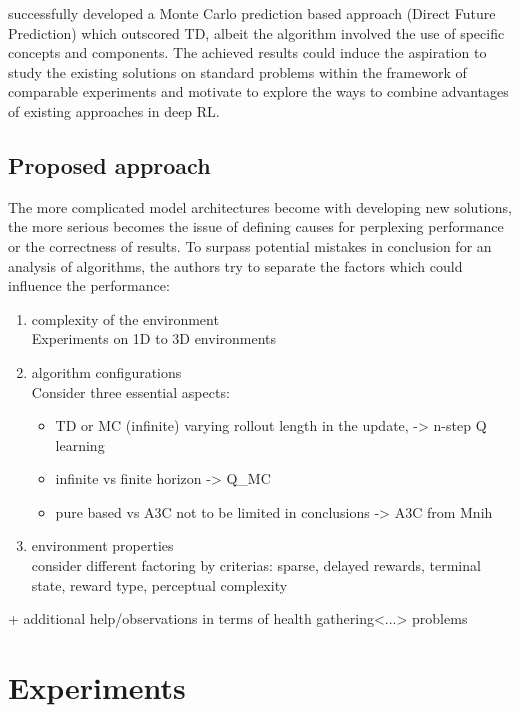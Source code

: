 \documentclass{article}
\begin{document}
\citet{DBLP:journals/corr/DosovitskiyK16} successfully developed a Monte Carlo
prediction based approach (Direct Future Prediction) which outscored TD,
albeit the algorithm involved the use of specific concepts and
components. The achieved results
could induce the aspiration to study the existing solutions on standard
problems within the framework of comparable experiments and motivate
to explore the ways to combine advantages of existing approaches in deep RL.

\subsection{Proposed approach}
\color{red}
The more complicated model architectures become with developing
new solutions, the more serious becomes the issue of defining causes
for perplexing performance
or the correctness of results.
To surpass potential mistakes in conclusion for an analysis of algorithms,
the authors try to separate the factors which could influence
the performance:
\begin{enumerate}
\item complexity of the environment  \\
Experiments on 1D to 3D environments
\item algorithm configurations \\
Consider three essential aspects:
\begin{itemize}
  \item TD or MC (infinite) varying rollout length in the
  update, -> n-step Q learning
  \item infinite vs finite horizon -> Q\_MC
  \item pure based vs A3C not to be limited in conclusions -> A3C from Mnih
\end{itemize}
\item environment properties \\
consider different factoring by criterias: sparse, delayed rewards, terminal
state, reward type, perceptual complexity
\end{enumerate}

+ additional help/observations in terms of health gathering<...> problems

\color{black}

\section{Experiments}
\end{document}
